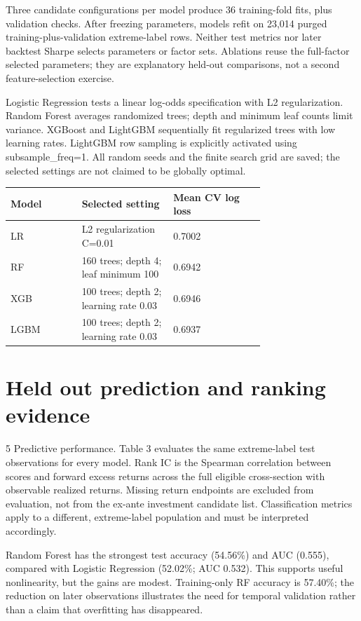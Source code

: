 \documentclass{article}
\begin{document}
Three candidate configurations per model produce 36 training-fold fits, plus validation checks. After freezing parameters, models refit on 23,014 purged training-plus-validation extreme-label rows. Neither test metrics nor later backtest Sharpe selects parameters or factor sets. Ablations reuse the full-factor selected parameters; they are explanatory held-out comparisons, not a second feature-selection exercise.

Logistic Regression tests a linear log-odds specification with L2 regularization. Random Forest averages randomized trees; depth and minimum leaf counts limit variance. XGBoost and LightGBM sequentially fit regularized trees with low learning rates. LightGBM row sampling is explicitly activated using subsample\_freq=1. All random seeds and the finite search grid are saved; the selected settings are not claimed to be globally optimal.

{\small\begin{tabular}{p{.1\linewidth}p{0.36\linewidth}p{0.36\linewidth}}
\toprule
Model & Selected setting & Mean CV log loss \\ \midrule
LR & L2 regularization C=0.01 & 0.7002 \\
RF & 160 trees; depth 4; leaf minimum 100 & 0.6942 \\
XGB & 100 trees; depth 2; learning rate 0.03 & 0.6946 \\
LGBM & 100 trees; depth 2; learning rate 0.03 & 0.6937 \\
\bottomrule\end{tabular}}
\par{}\par
\clearpage
\section*{Held out prediction and ranking evidence}
5 Predictive performance. Table 3 evaluates the same extreme-label test observations for every model. Rank IC is the Spearman correlation between scores and forward excess returns across the full eligible cross-section with observable realized returns. Missing return endpoints are excluded from evaluation, not from the ex-ante investment candidate list. Classification metrics apply to a different, extreme-label population and must be interpreted accordingly.

Random Forest has the strongest test accuracy (54.56\%) and AUC (0.555), compared with Logistic Regression (52.02\%; AUC 0.532). This supports useful nonlinearity, but the gains are modest. Training-only RF accuracy is 57.40\%; the reduction on later observations illustrates the need for temporal validation rather than a claim that overfitting has disappeared.
\end{document}
